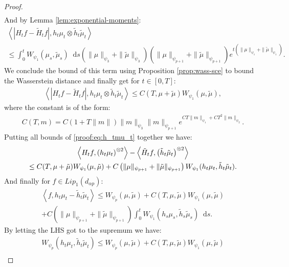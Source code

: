 \documentclass[11pt,a4paper]{article}
\newcommand{\brac}[1]{\left\langle#1\right\rangle}
\newcommand{\dd}{\mathop{}\!\mathrm{d}}
\begin{document}
\begin{proof}
\begin{align*}
    \end{align*}
    And by Lemma \ref{lem:exponential-moments}:
    \begin{multline*}
        \brac{\left|H_tf - \tilde{H}_tf\right|,h_t\mu_t \otimes \tilde{h}_t \tilde{\mu}_t} \\
         \leq \int_0^t W_{\psi_1}(\mu_s,\tilde{\mu}_s)\dd s \left(\|\mu\|_{\psi_3} + \|\tilde{\mu}\|_{\psi_3} \right)\left(\|\mu\|_{\psi_{p+1}}+ \|\tilde{\mu}\|_{\psi_{p+1}} \right) e^{t\left(\|\mu\|_{\psi_1} + \|\tilde{\mu}\|_{\psi_1}\right)}.
    \end{multline*}
    We conclude the bound of this term using Proposition \ref{prop:wass-sce} to bound the Wasserstein distance and finally get for $t \in [0,T]$:
    \begin{align*}
        \brac{\left|H_tf - \tilde{H}_tf\right|,h_t\mu_t \otimes \tilde{h}_t \tilde{\mu}_t}  \leq C(T,\mu + \tilde{\mu})  W_{\psi_1}(\mu,\tilde{\mu}),
    \end{align*}
    where the constant is of the form:
    \begin{align*}
        C(T,m) = C\left( 1 + T\|m\|\right)\|m\|_{\psi_3} \|m\|_{\psi_{p+1}}e^{CT \|m\|_{\psi_1} + CT^2\|m\|_{\psi_2}}.
    \end{align*}
    Putting all bounds of \eqref{proof:eq:h_tmu_t} together we have:
    \begin{multline*}
        \brac{H_tf,\left(h_t\mu_t\vphantom{\tilde{\mu}}\right)^{\otimes 2}} - \brac{\tilde{H}_tf,\left(\tilde{h}_t\tilde{\mu}_t\right)^{\otimes 2}}\\
        \leq C(T,\mu + \tilde{\mu}) W_{\psi_1}(\mu,\tilde{\mu}) + C\left(\|\mu\|_{\psi_{p+1}}+ \|\tilde{\mu}\|_{\psi_{p+1}} \right)W_{\psi_1}(h_t\mu_t, \tilde{h}_t \tilde{\mu}_t) .
    \end{multline*}
    And finally for $f \in Lip_1(d_{\alpha p})$:
    \begin{multline*}
        \brac{f, h_t\mu_t - \tilde{h}_t\tilde{\mu}_t} \leq W_{\psi_p}(\mu,\tilde{\mu}) +  C(T,\mu,\tilde{\mu}) W_{\psi_1}(\mu,\tilde{\mu})\\
         + C\left(\|\mu\|_{\psi_{p+1}}+ \|\tilde{\mu}\|_{\psi_{p+1}} \right)\int_0^t W_{\psi_1}(h_s\mu_s, \tilde{h}_s \tilde{\mu}_s) \dd s.
    \end{multline*}
    By letting the LHS got to the supremum we have:
    \begin{multline*}
        W_{\psi_p} \left(h_t\mu_t ,\tilde{h}_t\tilde{\mu}_t\right) \leq W_{\psi_p}(\mu,\tilde{\mu}) +  C(T,\mu,\tilde{\mu}) W_{\psi_1}(\mu,\tilde{\mu})\\

\end{multline*}
\end{proof}
\end{document}
